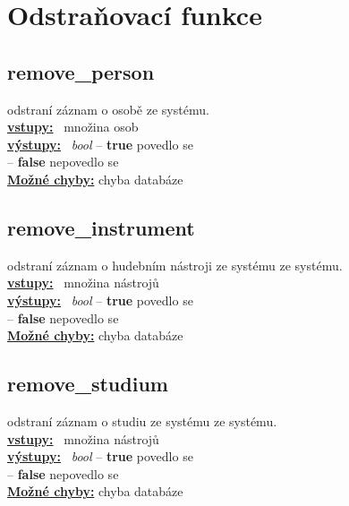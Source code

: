 \documentclass[a4paper, 11pt, twocolumn]{article}
\begin{document}
\section{Odstraňovací funkce}\label{odstraux148ovacuxed-funkce}


\subsection{remove\_person}
\vspace*{-0.3cm}
odstraní záznam o osobě ze systému. \\
\noindent \underline{\textbf{vstupy:}} \, množina osob  \\
\noindent \underline{\textbf{výstupy:}} \, \textit{bool} -- \textbf{true} povedlo se \\
\hspace*{2.35cm} -- \textbf{false} nepovedlo se  \\
\underline{\textbf{Možné chyby:}} chyba databáze

\subsection{remove\_instrument}
\vspace*{-0.3cm}
odstraní záznam o hudebním nástroji ze systému ze systému. \\
\noindent \underline{\textbf{vstupy:}} \, množina nástrojů  \\
\noindent \underline{\textbf{výstupy:}} \, \textit{bool} -- \textbf{true} povedlo se \\
\hspace*{2.35cm} -- \textbf{false} nepovedlo se  \\
\underline{\textbf{Možné chyby:}} chyba databáze

\subsection{remove\_studium}
\vspace*{-0.3cm}
odstraní záznam o studiu ze systému ze systému. \\
\noindent \underline{\textbf{vstupy:}} \, množina nástrojů  \\
\noindent \underline{\textbf{výstupy:}} \, \textit{bool} -- \textbf{true} povedlo se \\
\hspace*{2.35cm} -- \textbf{false} nepovedlo se  \\
\underline{\textbf{Možné chyby:}} chyba databáze
\vfill
\end{document}
